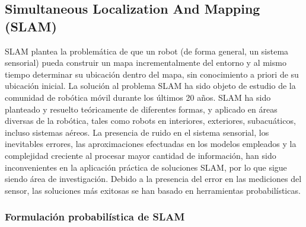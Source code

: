 \subsection{Simultaneous Localization And Mapping (SLAM)}

SLAM plantea la problemática de que un robot (de forma general, un sistema sensorial) pueda construir un mapa incrementalmente del entorno y al mismo tiempo determinar su ubicación dentro del mapa, sin conocimiento a priori de su ubicación inicial. La solución al problema SLAM ha sido objeto de estudio de la comunidad de robótica móvil durante los últimos 20 años. SLAM ha sido planteado y resuelto teóricamente de diferentes formas, y aplicado en áreas diversas de la robótica, tales como robots en interiores, exteriores, subacuáticos, incluso sistemas aéreos. La presencia de ruido en el sistema sensorial, los inevitables errores, las aproximaciones efectuadas en los modelos empleados y la complejidad creciente al procesar mayor cantidad de información, han sido inconvenientes en la aplicación práctica de soluciones SLAM, por lo que sigue siendo área de investigación. Debido a la presencia del error en las mediciones del sensor, las soluciones más exitosas se han basado en herramientas probabilísticas.

\subsubsection{Formulación probabilística de SLAM}

